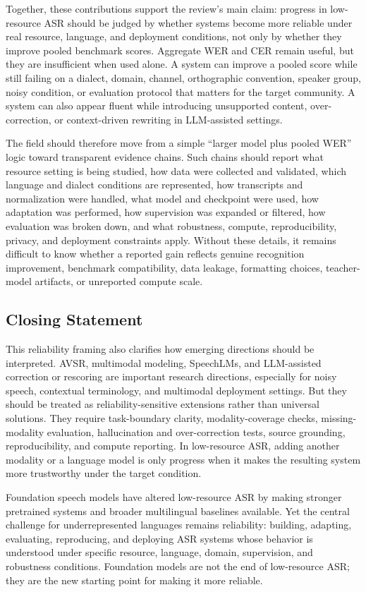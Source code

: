 \documentclass[pdflatex,sn-basic,iicol]{sn-jnl}
\theoremstyle{thmstyleone}
\theoremstyle{thmstyletwo}
\theoremstyle{thmstylethree}
\begin{document}
Together, these contributions support the review's main claim: progress in low-resource ASR should be judged by whether systems become more reliable under real resource, language, and deployment conditions, not only by whether they improve pooled benchmark scores. Aggregate WER and CER remain useful, but they are insufficient when used alone. A system can improve a pooled score while still failing on a dialect, domain, channel, orthographic convention, speaker group, noisy condition, or evaluation protocol that matters for the target community. A system can also appear fluent while introducing unsupported content, over-correction, or context-driven rewriting in LLM-assisted settings.

The field should therefore move from a simple ``larger model plus pooled WER'' logic toward transparent evidence chains. Such chains should report what resource setting is being studied, how data were collected and validated, which language and dialect conditions are represented, how transcripts and normalization were handled, what model and checkpoint were used, how adaptation was performed, how supervision was expanded or filtered, how evaluation was broken down, and what robustness, compute, reproducibility, privacy, and deployment constraints apply. Without these details, it remains difficult to know whether a reported gain reflects genuine recognition improvement, benchmark compatibility, data leakage, formatting choices, teacher-model artifacts, or unreported compute scale.

\subsection{Closing Statement}

This reliability framing also clarifies how emerging directions should be interpreted. AVSR, multimodal modeling, SpeechLMs, and LLM-assisted correction or rescoring are important research directions, especially for noisy speech, contextual terminology, and multimodal deployment settings. But they should be treated as reliability-sensitive extensions rather than universal solutions. They require task-boundary clarity, modality-coverage checks, missing-modality evaluation, hallucination and over-correction tests, source grounding, reproducibility, and compute reporting. In low-resource ASR, adding another modality or a language model is only progress when it makes the resulting system more trustworthy under the target condition.

Foundation speech models have altered low-resource ASR by making stronger pretrained systems and broader multilingual baselines available. Yet the central challenge for underrepresented languages remains reliability: building, adapting, evaluating, reproducing, and deploying ASR systems whose behavior is understood under specific resource, language, domain, supervision, and robustness conditions. Foundation models are not the end of low-resource ASR; they are the new starting point for making it more reliable.
\end{document}
